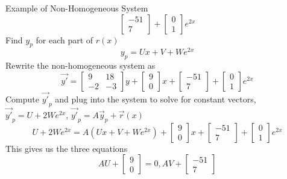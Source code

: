 \documentclass{article}
\begin{document}
\begin{multicols*}{3}
\begin{blackbox}{Example of Non-Homogeneous System}
{\[\begin{bmatrix}
                -51\\
                7
            \end{bmatrix} + \begin{bmatrix}
                0\\
                1
            \end{bmatrix}e^{2x}\]
            Find $y_p$ for each part of $r(x)$\\[-2ex]
            \[y_p = Ux + V + We^{2x}\]
            Rewrite the non-homogeneous system as 
            \[\vec{y'} = \begin{bmatrix}
                9 & 18\\
                -2 & -3
            \end{bmatrix}y + \begin{bmatrix}
                9\\0
            \end{bmatrix}x + \begin{bmatrix}
                -51\\7
            \end{bmatrix} + \begin{bmatrix}
                0\\1
            \end{bmatrix}e^{2x}\]
           Compute $\vec{y'}_p$ and plug into the system to solve for constant vectors, $\vec{y'}_p = U + 2We^{2x}$, $\vec{y'}_p = A\vec{y}_p + \vec{r}(x)$\\[-2ex]
           {\scriptsize
           \[
            U + 2We^{2x} = A(Ux + V + We^{2x}) + \begin{bmatrix}
                9\\0
            \end{bmatrix}x + \begin{bmatrix}
                -51\\7
            \end{bmatrix} + \begin{bmatrix}
                0\\1
            \end{bmatrix}e^{2x}
            \]
        }
            This gives us the three equations 
            \[AU + \begin{bmatrix}
                9\\0
            \end{bmatrix} = 0, AV + \begin{bmatrix}
                -51\\7

\end{bmatrix}\]}
\end{blackbox}
\end{multicols*}
\end{document}
